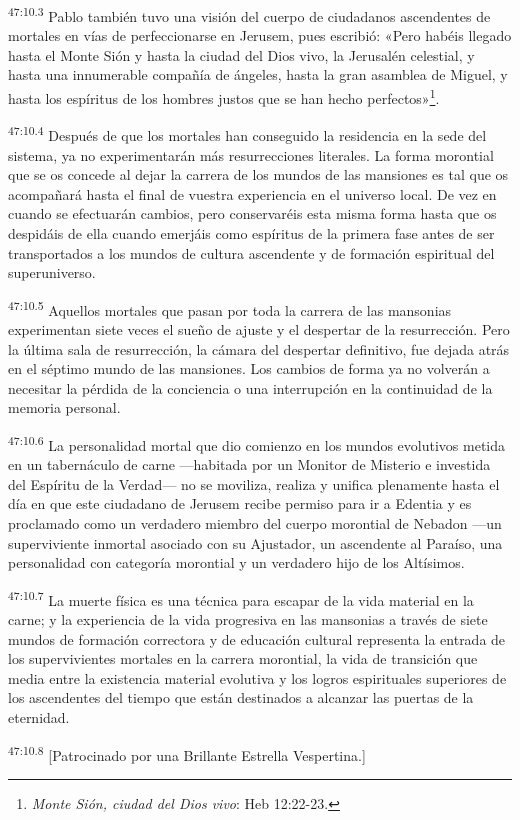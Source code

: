 \par
\textsuperscript{47:10.3} Pablo también tuvo una visión del cuerpo de ciudadanos ascendentes de mortales en vías de perfeccionarse en Jerusem, pues escribió: «Pero habéis llegado hasta el Monte Sión y hasta la ciudad del Dios vivo, la Jerusalén celestial, y hasta una innumerable compañía de ángeles, hasta la gran asamblea de Miguel, y hasta los espíritus de los hombres justos que se han hecho perfectos»\footnote{\textit{Monte Sión, ciudad del Dios vivo}: Heb 12:22-23.}.

\par
\textsuperscript{47:10.4} Después de que los mortales han conseguido la residencia en la sede del sistema, ya no experimentarán más resurrecciones literales. La forma morontial que se os concede al dejar la carrera de los mundos de las mansiones es tal que os acompañará hasta el final de vuestra experiencia en el universo local. De vez en cuando se efectuarán cambios, pero conservaréis esta misma forma hasta que os despidáis de ella cuando emerjáis como espíritus de la primera fase antes de ser transportados a los mundos de cultura ascendente y de formación espiritual del superuniverso.

\par
\textsuperscript{47:10.5} Aquellos mortales que pasan por toda la carrera de las mansonias experimentan siete veces el sueño de ajuste y el despertar de la resurrección. Pero la última sala de resurrección, la cámara del despertar definitivo, fue dejada atrás en el séptimo mundo de las mansiones. Los cambios de forma ya no volverán a necesitar la pérdida de la conciencia o una interrupción en la continuidad de la memoria personal.

\par
\textsuperscript{47:10.6} La personalidad mortal que dio comienzo en los mundos evolutivos metida en un tabernáculo de carne ---habitada por un Monitor de Misterio e investida del Espíritu de la Verdad--- no se moviliza, realiza y unifica plenamente hasta el día en que este ciudadano de Jerusem recibe permiso para ir a Edentia y es proclamado como un verdadero miembro del cuerpo morontial de Nebadon ---un superviviente inmortal asociado con su Ajustador, un ascendente al Paraíso, una personalidad con categoría morontial y un verdadero hijo de los Altísimos.

\par
\textsuperscript{47:10.7} La muerte física es una técnica para escapar de la vida material en la carne; y la experiencia de la vida progresiva en las mansonias a través de siete mundos de formación correctora y de educación cultural representa la entrada de los supervivientes mortales en la carrera morontial, la vida de transición que media entre la existencia material evolutiva y los logros espirituales superiores de los ascendentes del tiempo que están destinados a alcanzar las puertas de la eternidad.

\par
\textsuperscript{47:10.8} [Patrocinado por una Brillante Estrella Vespertina.]